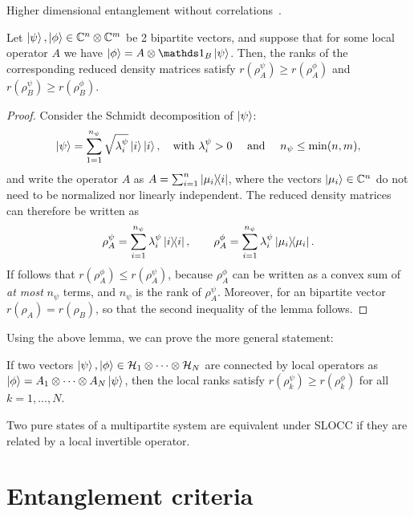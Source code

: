 \documentclass[12pt]{report}
\newcommand{\calH}{{\mathcal{H}}}
\begin{document}
Higher dimensional entanglement without correlations~\autocite{klobus2018higher}.
\begin{lemma}
	Let $\ket\psi, \ket\phi \in \mathbb{C}^n \otimes \mathbb{C}^m$ be 2 bipartite vectors, and suppose that for some local operator $A$ we have
	$\ket\phi = A\otimes \mathds1_B \ket\psi$.
	Then, the ranks of the corresponding reduced density matrices satisfy
	$r(\rho_A^\psi) \ge r(\rho_A^\phi)$ and
	$r(\rho_B^\psi) \ge r(\rho_B^\phi)$.
\end{lemma}
\begin{proof}
	Consider the Schmidt decomposition of $\ket\psi$:
	\begin{equation}
		\ket\psi = \sum_{1=1}^{n_\psi} \sqrt{\lambda_i^\psi} \ket{i} \ket{i},
		\quad \text{with } \lambda_i^\psi > 0
		\quad\text{ and }\quad n_\psi \le \min(n,m),
	\end{equation}
	and write the operator $A$  as
	$A = \sum_{i=1}^n \ketbra{\mu_i}{i}$,
	where the vectors $\ket{\mu_i} \in \mathbb{C}^n$ do not need to be normalized nor linearly independent.
	The reduced density matrices can therefore be written as
	\begin{equation}
		\rho_A^\psi = 
		\sum_{i=1}^{n_\psi} \lambda_i^\psi \ketbra{i}{i},
		\qquad
		\rho_A^\phi = 
		\sum_{i=1}^{n_\psi} \lambda_i^\psi \ketbra{\mu_i}{\mu_i}.
	\end{equation}
	If follows that $r(\rho_A^\phi) \le r(\rho_A^\psi)$, because $\rho_A^\phi$ can be written as a convex sum of \emph{at most} $n_\psi$ terms,
	and $n_\psi$ is the rank of $\rho_A^\psi$.
	Moreover, for an bipartite vector $r(\rho_A) = r(\rho_B)$, so that the second inequality of the lemma follows.
\end{proof}
Using the above lemma, we can prove the more general statement:
\begin{lemma}
	If two vectors $\ket\psi, \ket\phi \in \calH_1 \otimes \cdots \otimes \calH_N$
	are connected by local operators as
	$\ket\phi = A_1 \otimes \cdots \otimes A_N \ket\psi$, then the local ranks satisfy
	$r(\rho^\psi_k) \ge r(\rho^\phi_k)$ for all $k=1,...,N$.
\end{lemma}
\begin{thm}
	Two pure states of a multipartite system are equivalent under \ac{SLOCC}
	if they are related by a local invertible operator.
\end{thm}

\section{Entanglement criteria}
\end{document}
